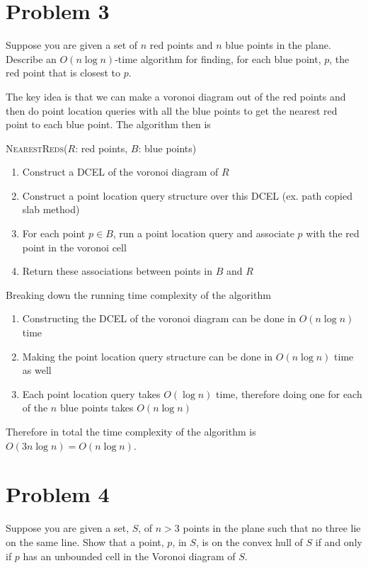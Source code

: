 \documentclass[12pt]{extarticle}
\begin{document}
\section*{Problem 3}
Suppose you are given a set of $n$ red points and $n$ blue points in the plane. Describe an $O(n \log n)$-time algorithm for finding, for each blue point, $p$, the red point that is closest to $p$.

\begin{solution}
    The key idea is that we can make a voronoi diagram out of the red points and then do point location queries with all the blue points to get the nearest red point to each blue point. The algorithm then is
    \begin{algorithm}[H]
        \caption{\textsc{NearestReds}($R$: red points, $B$: blue points)}
        \begin{enumerate}
            \item Construct a DCEL of the voronoi diagram of $R$
            \item Construct a point location query structure over this DCEL (ex. path copied slab method)
            \item For each point $p \in B$, run a point location query and associate $p$ with the red point in the voronoi cell
            \item Return these associations between points in $B$ and $R$
        \end{enumerate}
    \end{algorithm}

    Breaking down the running time complexity of the algorithm
    \begin{enumerate}
        \item Constructing the DCEL of the voronoi diagram can be done in $O(n \log n)$ time
        \item Making the point location query structure can be done in $O(n \log n)$ time as well
        \item Each point location query takes $O(\log n)$ time, therefore doing one for each of the $n$ blue points takes $O(n \log n)$
    \end{enumerate}
    Therefore in total the time complexity of the algorithm is $O(3 n \log n) = O(n \log n)$.
\end{solution}

\section*{Problem 4}
Suppose you are given a set, $S$, of $n > 3$ points in the plane such that no three lie on the same line. Show that a point, $p$, in $S$, is on the convex hull of $S$ if and only if $p$ has an unbounded cell in the Voronoi diagram of $S$.
\end{document}
